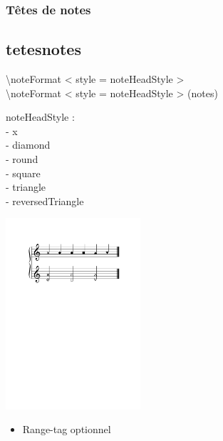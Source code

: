 \documentclass[12pt]{beamer}
\newenvironment{code}
  {\fontfamily{prc}\selectfont}{}
\begin{document}
    \begin{frame}
    \frametitle{Têtes de notes}
    \subsection{tetesnotes}
    
    \begin{code} \textbackslash{}noteFormat \textless{} style = noteHeadStyle \textgreater{}\\ 
    \textbackslash{}noteFormat \textless{} style = noteHeadStyle \textgreater{} (notes)\\ 
    \end{code}
    
    \begin{multicols}{2}

    \begin{code}
    noteHeadStyle :\\
      - x\\
      - diamond\\
      - round \\
      - square\\
      - triangle\\
      - reversedTriangle
    \end{code}
    
    \columnbreak

    \includegraphics[width=5cm]{img/partitions/noteheads.pdf}
    
   \end{multicols}

    \begin{itemize}
      \item Range-tag optionnel
    \end{itemize}
   
    
    \end{frame}
\end{document}
